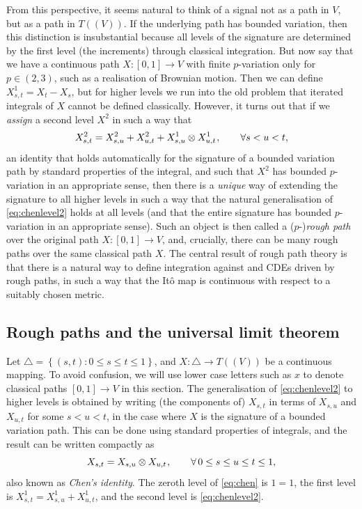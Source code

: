 \documentclass[11pt, letterpaper]{article}
\theoremstyle{definition}
\theoremstyle{remark}
\newcommand{\m}{\hspace{0.25mm}}
\begin{document}
\begin{appendices}
From this perspective, it seems natural to think of a signal not as a path in $V$, but as a path in $T((V))$. If the underlying path has bounded variation, then this distinction is insubstantial because all levels of the signature are determined by the first level (the increments) through classical integration. But now say that we have a continuous path $X\colon [0,1] \to V$ with finite $p$-variation only for $p \in (2,3)$, such as a realisation of Brownian motion. Then we can define $X^1_{s,t} = X_t - X_s$, but for higher levels we run into the old problem that iterated integrals of $X$ cannot be defined classically. However, it turns out that if we \emph{assign} a second level $X^2$ in such a way that 
\begin{equation}\label{eq:chenlevel2}
    X^2_{s,t} = X^2_{s,u} + X^2_{u,t} + X^1_{s,u} \otimes X^1_{u,t}\m,\qquad \forall s < u < t,
\end{equation}
an identity that holds automatically for the signature of a bounded variation path by standard properties of the integral, and such that $X^2$ has bounded $p$-variation in an appropriate sense, then there is a \emph{unique} way of extending the signature to all higher levels in such a way that the natural generalisation of \eqref{eq:chenlevel2} holds at all levels (and that the entire signature has bounded $p$-variation in an appropriate sense). Such an object is then called a ($p$-)\emph{rough path} over the original path $X\colon [0,1] \to V$, and, crucially, there can be many rough paths over the same classical path $X$. The central result of rough path theory is that there is a natural way to define integration against and CDEs driven by rough paths, in such a way that the It\^o map is continuous with respect to a suitably chosen metric.


\subsection{Rough paths and the universal limit theorem}

Let $\triangle = \left\{ (s,t)\colon 0 \le s \le t \le 1 \right\} $, and $X\colon \triangle \to T((V))$ be a continuous mapping. To avoid confusion, we will use lower case letters such as $x$ to denote classical paths $[0,1]\to V$ in this section. The generalisation of \eqref{eq:chenlevel2} to higher levels is obtained by writing (the components of) $X_{s,t}$ in terms of $X_{s,u}$ and $X_{u,t}$ for some $s < u < t$, in the case where $X$ is the signature of a bounded variation path. This can be done using standard properties of integrals, and the result can be written compactly as
\begin{equation}\label{eq:chen}
    X_{s,t} = X_{s,u} \otimes X_{u,t}\m,\qquad \forall\, 0 \le s \le u \le t \le 1,
\end{equation}
also known as \emph{Chen's identity}.
The zeroth level of \eqref{eq:chen} is $1 = 1$, the first level is $X^1_{s,t} = X^1_{s,u} + X^1_{u,t}$, and the second level is \eqref{eq:chenlevel2}.


\end{appendices}
\end{document}
